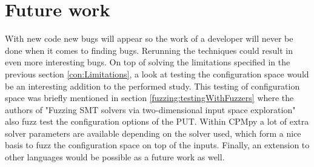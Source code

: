 


\section{Future work}
\label{con:FutureWork}
With new code new bugs will appear so the work of a developer will never be done when it comes to finding bugs. Rerunning the techniques could result in even more interesting bugs. 
On top of solving the limitations specified in the previous section \ref{con:Limitations},
a look at testing the configuration space would be an interesting addition to the performed study. This testing of configuration space was briefly mentioned in section \ref{fuzzing:testingWithFuzzers} where the authors of "Fuzzing SMT solvers via two-dimensional input space exploration" \cite{42FalconFuzzingConfigurationSettingsAndNormal} also fuzz test the configuration options of the PUT. Within CPMpy a lot of extra solver parameters are available depending on the solver used, which form a nice basis to fuzz the configuration space on top of the inputs.
Finally, an extension to other languages would be possible as a future work as well.


